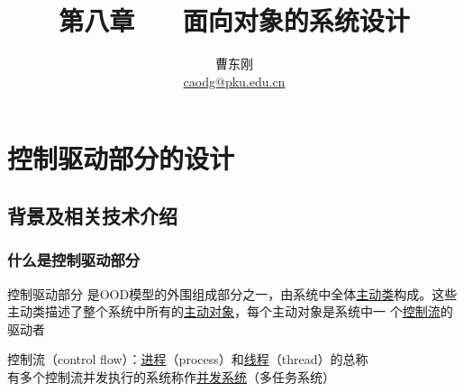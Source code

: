 \documentclass[compress]{beamer}
\begin{document}

					
\title{第八章 ~~ 面向对象的系统设计\MakeUppercase{}}

\author[面向对象的分析与设计]
{曹东刚\\\href{mailto:caodg@pku.edu.cn}{caodg@pku.edu.cn}}


\date{}


\begin{frame}[plain]
	\titlepage
\end{frame}

\setcounter{framenumber}{0}

\section{控制驱动部分的设计}

\subsection[背景]{背景及相关技术介绍}

\begin{frame}
  \frametitle{什么是控制驱动部分}
  \begin{block}{控制驱动部分}
    是OOD模型的外围组成部分之一，由系统中全体\uline{主动类}构成。这些
    主动类描述了整个系统中所有的\uline{主动对象}，每个主动对象是系统中一
    个\uline{控制流}的驱动者 
  \end{block}

  控制流（control flow）：\uline{进程}（process）和\uline{线程}（thread）的总称 \\

  有多个控制流并发执行的系统称作\uline{并发系统}（多任务系统）

\end{frame}
\end{document}

